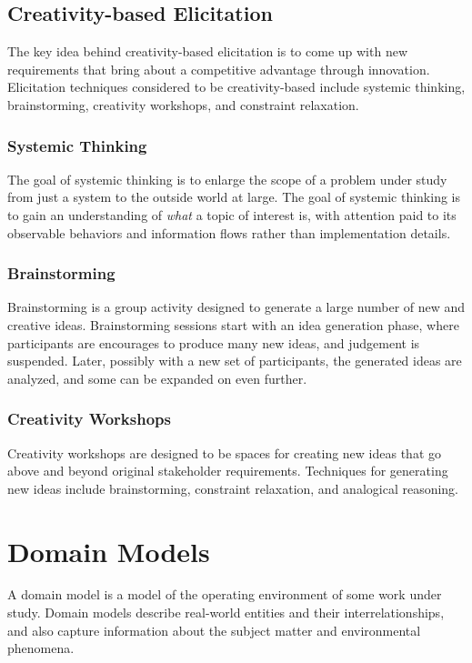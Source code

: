 \documentclass[12pt,titlepage]{article}
\begin{document}
    \subsection{Creativity-based Elicitation}
      The key idea behind creativity-based elicitation is to come up with new requirements that bring about a competitive advantage through innovation. Elicitation techniques
      considered to be creativity-based include systemic thinking, brainstorming, creativity workshops, and constraint relaxation.

      \subsubsection{Systemic Thinking}
        The goal of systemic thinking is to enlarge the scope of a problem under study from just a system to the outside world at large. The goal of systemic thinking is to
        gain an understanding of \textit{what} a topic of interest is, with attention paid to its observable behaviors and information flows rather than implementation
        details.

      \subsubsection{Brainstorming}
        Brainstorming is a group activity designed to generate a large number of new and creative ideas. Brainstorming sessions start with an idea generation phase, where
        participants are encourages to produce many new ideas, and judgement is suspended. Later, possibly with a new set of participants, the generated ideas are analyzed,
        and some can be expanded on even further.

      \subsubsection{Creativity Workshops}
        Creativity workshops are designed to be spaces for creating new ideas that go above and beyond original stakeholder requirements. Techniques for generating new ideas
        include brainstorming, constraint relaxation, and analogical reasoning.

  \newpage

  \section{Domain Models}
    A domain model is a model of the operating environment of some work under study. Domain models describe real-world entities and their interrelationships, and also capture
    information about the subject matter and environmental phenomena.
\end{document}
